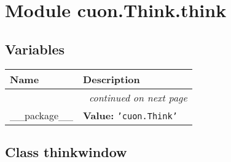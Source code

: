 %
%
%


\section{Module cuon.Think.think}

    \label{cuon:Think:think}


  \subsection{Variables}

    \vspace{-1cm}
\hspace{\varindent}\begin{longtable}{|p{\varnamewidth}|p{\vardescrwidth}|l}
\cline{1-2}
\cline{1-2} \centering \textbf{Name} & \centering \textbf{Description}& \\
\cline{1-2}
\endhead\cline{1-2}\multicolumn{3}{r}{\small\textit{continued on next page}}\\\endfoot\cline{1-2}
\endlastfoot\raggedright \_\-\_\-p\-a\-c\-k\-a\-g\-e\-\_\-\_\- & \raggedright \textbf{Value:} 
{\tt \texttt{'}\texttt{cuon.Think}\texttt{'}}&\\
\cline{1-2}
\end{longtable}



\subsection{Class thinkwindow}

